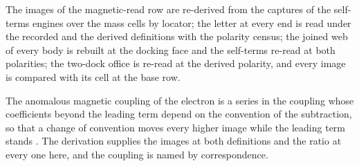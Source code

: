 The images of the magnetic-read row are re-derived from the captures of the self-terms engines over the mass cells by locator; the letter at every end is read under the recorded and the derived definitions with the polarity census; the joined web of every body is rebuilt at the docking face and the self-terms re-read at both polarities; the two-dock office is re-read at the derived polarity, and every image is compared with its cell at the base row.

\begin{chbridge}
The anomalous magnetic coupling of the electron is a series in the coupling whose coefficients beyond the leading term depend on the convention of the subtraction, so that a change of convention moves every higher image while the leading term stands \cite{Schwinger1948,Petermann1957}. The derivation supplies the images at both definitions and the ratio at every one here, and the coupling is named by correspondence.
\end{chbridge}
